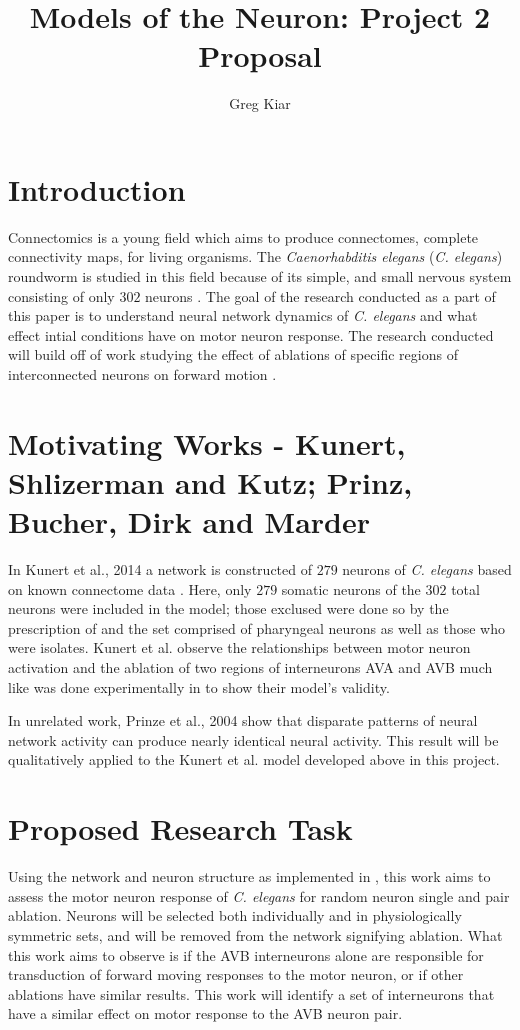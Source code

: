 \documentclass[11pt]{article} %
\title{Models of the Neuron: Project 2 Proposal}
\author{Greg Kiar}
\begin{document}
\maketitle

\section{Introduction}

Connectomics is a young field which aims to produce connectomes, complete connectivity maps, for living organisms. The \emph{Caenorhabditis elegans} (\emph{C. elegans}) roundworm is studied in this field because of its simple, and small nervous system consisting of only $302$ neurons \cite{White1986,Dunn2003}. The goal of the research conducted as a part of this paper is to understand neural network dynamics of \emph{C. elegans} and what effect intial conditions have on motor neuron response. The research conducted will build off of work studying the effect of ablations of specific regions of interconnected neurons on forward motion \cite{Kunert2014}.

\section{Motivating Works - Kunert, Shlizerman and Kutz; Prinz, Bucher, Dirk and Marder}

In Kunert et al., 2014 \cite{Kunert2014} a network is constructed of $279$ neurons of \emph{C. elegans} based on known connectome data \cite{Varshney2011}. Here, only $279$ somatic neurons of the $302$ total neurons were included in the model; those exclused were done so by the prescription of \cite{Varshney2011} and the set comprised of pharyngeal neurons as well as those who were isolates. Kunert et al. observe the relationships between motor neuron activation and the ablation of two regions of interneurons AVA and AVB much like was done experimentally in \cite{Chalfie1985} to show their model's validity.

In unrelated work, Prinze et al., 2004 \cite{Prinz2004} show that disparate patterns of neural network activity can produce nearly identical neural activity. This result will be qualitatively applied to the Kunert et al. model developed above in this project.

\section{Proposed Research Task}
Using the network and neuron structure as implemented in \cite{Kunert2014}, this work aims to assess the motor neuron response of \emph{C. elegans} for random neuron single and pair ablation. Neurons will be selected both individually and in physiologically symmetric sets, and will be removed from the network signifying ablation. What this work aims to observe is if the AVB interneurons alone are responsible for transduction of forward moving responses to the motor neuron, or if other ablations have similar results. This work will identify a set of interneurons that have a similar effect on motor response to the AVB neuron pair.

{}

\end{document}

